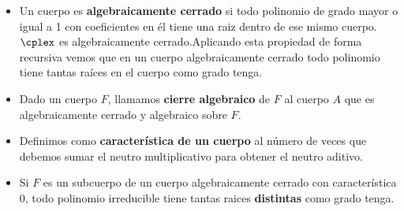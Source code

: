 \documentclass[nochap]{apuntes}
\begin{document}
\begin{itemize}
\item Un cuerpo es \textbf{algebraicamente cerrado} si todo polinomio de grado mayor o igual a 1 con coeficientes en él tiene una raiz dentro de ese mismo cuerpo. $\cplex$ es algebraicamente cerrado.Aplicando esta propiedad de forma recursiva vemos que en un cuerpo algebraicamente cerrado todo polinomio tiene tantas raíces en el cuerpo como grado tenga.

\item Dado un cuerpo $F$, llamamos \textbf{cierre algebraico} de $F$ al cuerpo $A$ que es algebraicamente cerrado y algebraico sobre $F$.

\item Definimos como \textbf{característica de un cuerpo} al número de veces que debemos sumar el neutro multiplicativo para obtener el neutro aditivo.

\item Si $F$ es un subcuerpo de un cuerpo algebraicamente cerrado con característica 0, todo polinomio irreducible tiene tantas raices \textbf{distintas} como grado tenga.

\end{itemize}
\end{document}
